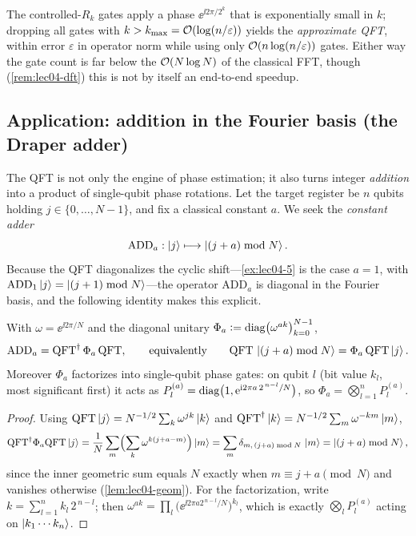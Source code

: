 \begin{remark}
\label{rem:lec04-approx}
The controlled-$R_k$ gates apply a phase $\ee^{\ii 2\pi/2^{k}}$ that is
exponentially small in $k$; dropping all gates with $k>k_{\max}
=\mathcal{O}(\log(n/\varepsilon))$ yields the \emph{approximate QFT}, within
error $\varepsilon$ in operator norm while using only
$\mathcal{O}(n\log(n/\varepsilon))$ gates. Either way the gate count is far below the
$\mathcal{O}(N\log N)$ of the classical FFT, though (\cref{rem:lec04-dft}) this is not
by itself an end-to-end speedup.
\end{remark}

\subsection*{Application: addition in the Fourier basis (the Draper adder)}
\label{sec:lec04-qftadder}

The QFT is not only the engine of phase estimation; it also turns integer
\emph{addition} into a product of single-qubit phase rotations. Let the target
register be $n$ qubits holding $j\in\{0,\dots,N-1\}$, and fix a classical
constant $a$. We seek the \emph{constant adder}
\[
  \mathrm{ADD}_a:\ket{j}\longmapsto\ket{(j+a)\bmod N}.
\]
Because the QFT diagonalizes the cyclic shift---\cref{ex:lec04-5} is the case
$a=1$, with $\mathrm{ADD}_1\ket{j}=\ket{(j+1)\bmod N}$---the operator
$\mathrm{ADD}_a$ is diagonal in the Fourier basis, and the following identity
makes this explicit.

\begin{proposition}
\label{prop:lec04-draper}
With $\omega=\ee^{\ii 2\pi/N}$ and the diagonal unitary
$\Phi_a\vcentcolon=\operatorname{diag}\bigl(\omega^{ak}\bigr)_{k=0}^{N-1}$,
\[
  \mathrm{ADD}_a=\mathrm{QFT}^{\dagger}\,\Phi_a\,\mathrm{QFT},
  \qquad\text{equivalently}\qquad
  \mathrm{QFT}\,\ket{(j+a)\bmod N}=\Phi_a\,\mathrm{QFT}\ket{j}.
\]
Moreover $\Phi_a$ factorizes into single-qubit phase gates: on qubit $l$
(bit value $k_l$, most significant first) it acts as
$P_l^{(a)}=\operatorname{diag}\bigl(1,\mathrm{e}^{\mathrm{i} 2\pi a\,2^{\,n-l}/N}\bigr)$, so
$\Phi_a=\bigotimes_{l=1}^{n}P_l^{(a)}$.
\end{proposition}

\begin{proof}
Using $\mathrm{QFT}\ket{j}=N^{-1/2}\sum_k\omega^{jk}\ket{k}$ and
$\mathrm{QFT}^{\dagger}\ket{k}=N^{-1/2}\sum_m\omega^{-km}\ket{m}$,
\[
  \mathrm{QFT}^{\dagger}\Phi_a\mathrm{QFT}\ket{j}
   =\frac1N\sum_{m}\Bigl(\sum_{k}\omega^{k(j+a-m)}\Bigr)\ket{m}
   =\sum_m\delta_{m,\,(j+a)\bmod N}\,\ket{m}
   =\ket{(j+a)\bmod N},
\]
since the inner geometric sum equals $N$ exactly when $m\equiv j+a\pmod N$ and
vanishes otherwise (\cref{lem:lec04-geom}). For the factorization, write
$k=\sum_{l=1}^n k_l\,2^{\,n-l}$; then
$\omega^{ak}=\prod_l\bigl(\ee^{\ii 2\pi a2^{\,n-l}/N}\bigr)^{k_l}$, which is
exactly $\bigotimes_l P_l^{(a)}$ acting on $\ket{k_1\cdots k_n}$.
\end{proof}

